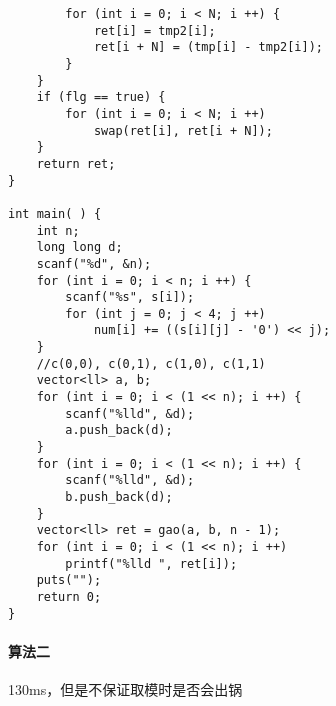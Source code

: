 \documentclass[UTF8]{ctexart}
\begin{document}
\begin{framed}
\begin{lstlisting}
        for (int i = 0; i < N; i ++) {
            ret[i] = tmp2[i];
            ret[i + N] = (tmp[i] - tmp2[i]);
        }
    }
    if (flg == true) {
        for (int i = 0; i < N; i ++)
            swap(ret[i], ret[i + N]);
    }
    return ret;
}
 
int main( ) {
    int n;
    long long d;
    scanf("%d", &n);
    for (int i = 0; i < n; i ++) {
        scanf("%s", s[i]);
        for (int j = 0; j < 4; j ++)
            num[i] += ((s[i][j] - '0') << j);
    }
    //c(0,0), c(0,1), c(1,0), c(1,1)
    vector<ll> a, b;
    for (int i = 0; i < (1 << n); i ++) {
        scanf("%lld", &d);
        a.push_back(d);
    }
    for (int i = 0; i < (1 << n); i ++) {
        scanf("%lld", &d);
        b.push_back(d);
    }
    vector<ll> ret = gao(a, b, n - 1);
    for (int i = 0; i < (1 << n); i ++)
        printf("%lld ", ret[i]);
    puts("");
    return 0;
}
\end{lstlisting}
\end{framed}

\paragraph{算法二}

130ms，但是不保证取模时是否会出锅
\end{document}

